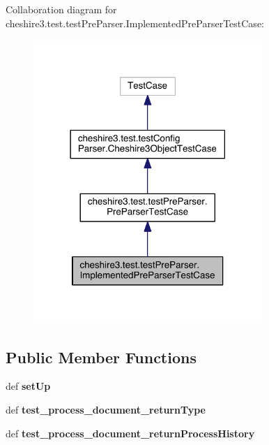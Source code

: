 Collaboration diagram for cheshire3.\-test.\-test\-Pre\-Parser.\-Implemented\-Pre\-Parser\-Test\-Case\-:
\nopagebreak
\begin{figure}[H]
\begin{center}
\leavevmode
\includegraphics[width=246pt]{classcheshire3_1_1test_1_1test_pre_parser_1_1_implemented_pre_parser_test_case__coll__graph}
\end{center}
\end{figure}
\subsection*{Public Member Functions}
\begin{DoxyCompactItemize}
\item 
\hypertarget{classcheshire3_1_1test_1_1test_pre_parser_1_1_implemented_pre_parser_test_case_a7f44cdcba7625cf6b9b4628b23827e36}{def {\bfseries set\-Up}}\label{classcheshire3_1_1test_1_1test_pre_parser_1_1_implemented_pre_parser_test_case_a7f44cdcba7625cf6b9b4628b23827e36}

\item 
\hypertarget{classcheshire3_1_1test_1_1test_pre_parser_1_1_implemented_pre_parser_test_case_a4fe12c652662da9af3f6cb5be9570295}{def {\bfseries test\-\_\-process\-\_\-document\-\_\-return\-Type}}\label{classcheshire3_1_1test_1_1test_pre_parser_1_1_implemented_pre_parser_test_case_a4fe12c652662da9af3f6cb5be9570295}

\item 
\hypertarget{classcheshire3_1_1test_1_1test_pre_parser_1_1_implemented_pre_parser_test_case_a0ceba6618bc2a1b80b3af0d0fba611fb}{def {\bfseries test\-\_\-process\-\_\-document\-\_\-return\-Process\-History}}\label{classcheshire3_1_1test_1_1test_pre_parser_1_1_implemented_pre_parser_test_case_a0ceba6618bc2a1b80b3af0d0fba611fb}

\end{DoxyCompactItemize}
